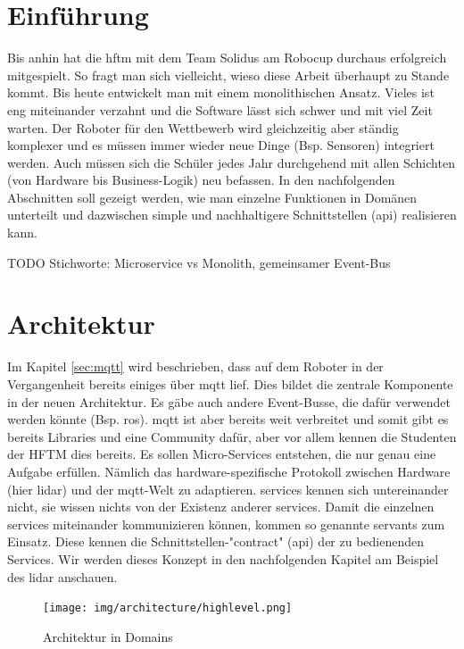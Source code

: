 \documentclass[11pt,english,german]{report}
\begin{document}
\section{Einführung}
Bis anhin hat die \acrshort{hftm} mit dem Team Solidus am Robocup durchaus erfolgreich mitgespielt. So fragt man sich vielleicht, wieso diese Arbeit überhaupt zu Stande kommt. Bis heute entwickelt man mit einem monolithischen Ansatz. Vieles ist eng miteinander verzahnt und die Software lässt sich schwer und mit viel Zeit warten. Der Roboter für den Wettbewerb wird gleichzeitig aber ständig komplexer und es müssen immer wieder neue Dinge (Bsp. Sensoren) integriert werden. Auch müssen sich die Schüler jedes Jahr durchgehend mit allen Schichten (von Hardware bis Business-Logik) neu befassen. In den nachfolgenden Abschnitten soll gezeigt werden, wie man einzelne Funktionen in Domänen unterteilt und dazwischen simple und nachhaltigere Schnittstellen (\acrshort{api}) realisieren kann.



\bigskip
TODO
Stichworte: Microservice vs Monolith, gemeinsamer Event-Bus

\section{Architektur}
Im Kapitel \ref{sec:mqtt} wird beschrieben, dass auf dem Roboter in der Vergangenheit bereits einiges über \acrshort{mqtt} lief. Dies bildet die zentrale Komponente in der neuen Architektur. Es gäbe auch andere Event-Busse, die dafür verwendet werden könnte (Bsp. \acrshort{ros}). \acrshort{mqtt} ist aber bereits weit verbreitet und somit gibt es bereits Libraries und eine Community dafür, aber vor allem kennen die Studenten der HFTM dies bereits. Es sollen Micro-Services entstehen, die nur genau eine Aufgabe erfüllen. Nämlich das hardware-spezifische Protokoll zwischen Hardware (hier \acrshort{lidar}) und der \acrshort{mqtt}-Welt zu adaptieren. \Glspl{service} kennen sich untereinander nicht, sie wissen nichts von der Existenz anderer \glspl{service}. Damit die einzelnen \Glspl{service} miteinander kommunizieren können, kommen so genannte \Glspl{servant} zum Einsatz. Diese kennen die Schnittstellen-"\gls{contract}" (\acrshort{api}) der zu bedienenden Services. Wir werden dieses Konzept in den nachfolgenden Kapitel am Beispiel des \acrshort{lidar} anschauen.

\begin{figure}[H]
	\centering
	\texttt{[image: img/architecture/highlevel.png]}
	\caption{Architektur in Domains}
	\label{fig:architecture_highlevel}
\end{figure}
\end{document}
